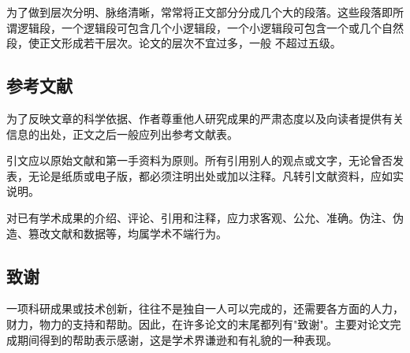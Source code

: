 \documentclass[onecolumn,oneside]{BUPTHomework}
\begin{document}
  为了做到层次分明、脉络清晰，常常将正文部分分成几个大的段落。这些段落即所谓逻辑段，一个逻辑段可包含几个小逻辑段，一个小逻辑段可包含一个或几个自然段，使正文形成若干层次。论文的层次不宜过多，一般 不超过五级。

  \subsection*{参考文献}

  为了反映文章的科学依据、作者尊重他人研究成果的严肃态度以及向读者提供有关信息的出处，正文之后一般应列出参考文献表。

  引文应以原始文献和第一手资料为原则。所有引用别人的观点或文字，无论曾否发表，无论是纸质或电子版，都必须注明出处或加以注释。凡转引文献资料，应如实说明。

  对已有学术成果的介绍、评论、引用和注释，应力求客观、公允、准确。伪注、伪造、篡改文献和数据等，均属学术不端行为。

  \subsection*{致谢}

  一项科研成果或技术创新，往往不是独自一人可以完成的，还需要各方面的人力，财力，物力的支持和帮助。因此，在许多论文的末尾都列有"致谢"。主要对论文完成期间得到的帮助表示感谢，这是学术界谦逊和有礼貌的一种表现。
\end{document}
